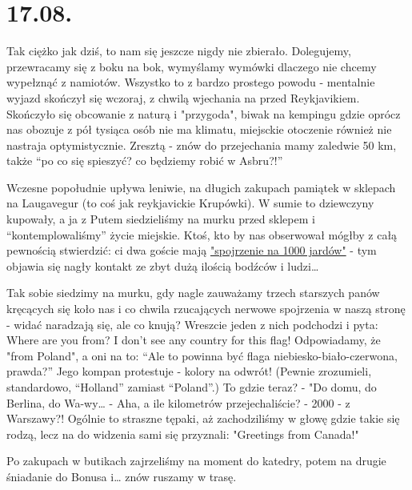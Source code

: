 \chapter*{17.08.}

Tak ciężko jak dziś, to nam się jeszcze nigdy nie zbierało. Dolegujemy, przewracamy się z boku na bok, wymyślamy wymówki dlaczego nie chcemy wypełznąć z namiotów. Wszystko to z bardzo prostego powodu - mentalnie wyjazd skończył się wczoraj, z chwilą wjechania na  przed Reykjavikiem. Skończyło się obcowanie z naturą i "przygoda", biwak na kempingu gdzie oprócz nas obozuje z pół tysiąca osób nie ma klimatu, miejsckie otoczenie również nie nastraja optymistycznie. Zresztą - znów do przejechania mamy zaledwie 50 km, także “po co się spieszyć? co będziemy robić w Asbru?!”

Wczesne popołudnie upływa leniwie, na długich zakupach pamiątek w sklepach na Laugavegur (to coś jak reykjavickie Krupówki). W sumie to dziewczyny kupowały, a ja z Putem siedzieliśmy na murku przed sklepem i “kontemplowaliśmy” życie miejskie. Ktoś, kto by nas obserwował mógłby z całą pewnością stwierdzić: ci dwa goście mają \href{http://en.wikipedia.org/wiki/Thousand-yard_stare}{"spojrzenie na 1000 jardów"} - tym objawia się nagły kontakt ze zbyt dużą ilością bodźców i ludzi…


Tak sobie siedzimy na murku, gdy nagle zauważamy trzech starszych panów kręcących się koło nas i co chwila rzucających nerwowe spojrzenia w naszą stronę - widać naradzają się, ale co knują? Wreszcie jeden z nich podchodzi i pyta: Where are you from? I don’t see any country for this flag! Odpowiadamy, że "from Poland", a oni na to: “Ale to powinna być flaga niebiesko-biało-czerwona, prawda?” Jego kompan protestuje - kolory na odwrót! (Pewnie zrozumieli, standardowo, “Holland” zamiast “Poland”.) To gdzie teraz? - "Do domu, do Berlina, do Wa-wy… - Aha, a ile kilometrów przejechaliście? - 2000 - z Warszawy?! Ogólnie to straszne tępaki, aż zachodziliśmy w głowę gdzie takie się rodzą, lecz na do widzenia sami się przyznali: "Greetings from Canada!"

Po zakupach w butikach zajrzeliśmy na moment do katedry, potem na drugie śniadanie do Bonusa i… znów ruszamy w trasę.

